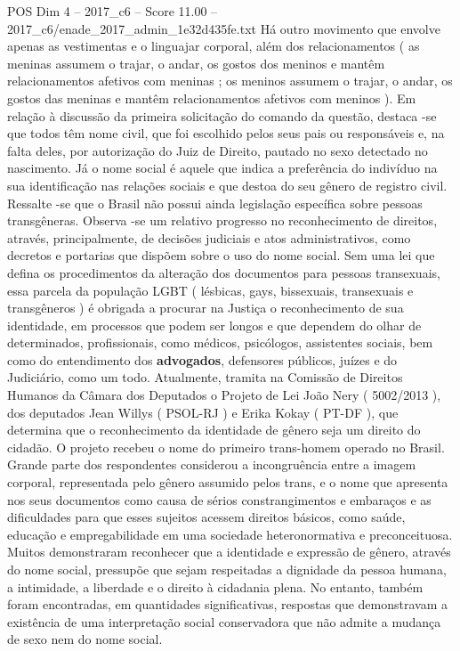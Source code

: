 \begin{textsample}{POS Dim 4 – 2017\_c6 – Score 11.00 – 2017\_c6/enade\_2017\_admin\_1e32d435fe.txt}
Há outro movimento que envolve apenas as vestimentas e o linguajar corporal, além dos relacionamentos ( as meninas assumem o trajar, o andar, os gostos dos meninos e mantêm relacionamentos afetivos com meninas ; os meninos assumem o trajar, o andar, os gostos das meninas e mantêm relacionamentos afetivos com meninos ).
Em relação à discussão da primeira solicitação do comando da questão, destaca -se que todos têm nome civil, que foi escolhido pelos seus pais ou responsáveis e, na falta deles, por autorização do Juiz de Direito, pautado no sexo detectado no nascimento.
Já o nome social é aquele que indica a preferência do indivíduo na sua identificação nas relações sociais e que destoa do seu gênero de registro civil.
Ressalte -se que o Brasil não possui ainda legislação específica sobre pessoas transgêneras.
Observa -se um relativo progresso no reconhecimento de direitos, através, principalmente, de decisões judiciais e atos administrativos, como decretos e portarias que dispõem sobre o uso do nome social.
Sem uma lei que defina os procedimentos da alteração dos documentos para pessoas transexuais, essa parcela da população LGBT ( lésbicas, gays, bissexuais, transexuais e transgêneros ) é obrigada a procurar na Justiça o reconhecimento de sua identidade, em processos que podem ser longos e que dependem do olhar de determinados, profissionais, como médicos, psicólogos, assistentes sociais, bem como do entendimento dos \textbf{advogados}, defensores públicos, juízes e do Judiciário, como um todo.
Atualmente, tramita na Comissão de Direitos Humanos da Câmara dos Deputados o Projeto de Lei João Nery ( 5002/2013 ), dos deputados Jean Willys ( PSOL-RJ ) e Erika Kokay ( PT-DF ), que determina que o reconhecimento da identidade de gênero seja um direito do cidadão.
O projeto recebeu o nome do primeiro trans-homem operado no Brasil.
Grande parte dos respondentes considerou a incongruência entre a imagem corporal, representada pelo gênero assumido pelos trans, e o nome que apresenta nos seus documentos como causa de sérios constrangimentos e embaraços e as dificuldades para que esses sujeitos acessem direitos básicos, como saúde, educação e empregabilidade em uma sociedade heteronormativa e preconceituosa.
Muitos demonstraram reconhecer que a identidade e expressão de gênero, através do nome social, pressupõe que sejam respeitadas a dignidade da pessoa humana, a intimidade, a liberdade e o direito à cidadania plena.
No entanto, também foram encontradas, em quantidades significativas, respostas que demonstravam a existência de uma interpretação social conservadora que não admite a mudança de sexo nem do nome social.

\end{textsample}
